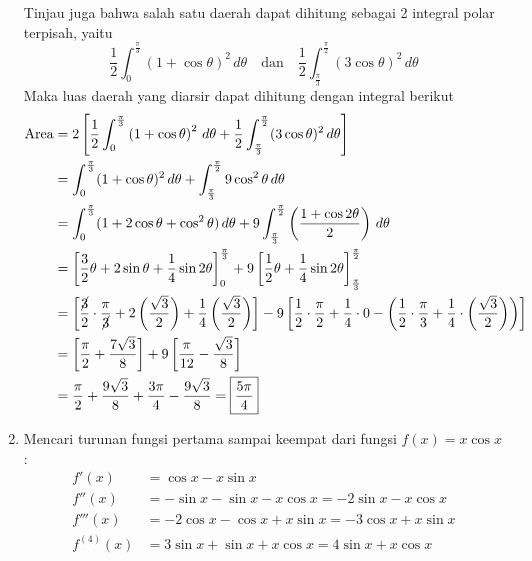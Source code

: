 \documentclass[11pt,openany,a4paper]{article}
\begin{document}
\begin{enumerate}
        Tinjau juga bahwa salah satu daerah dapat dihitung sebagai 2 integral polar terpisah, yaitu
        \[ \frac{1}{2}\int_{0}^{\frac{\pi}{3}} \left(1+\cos\theta\right)^2 \, d\theta \quad\text{dan}\quad \frac{1}{2}\int_{\frac{\pi}{3}}^{\frac{\pi}{2}} \left(3\cos\theta\right)^2 \, d\theta \]
        Maka luas daerah yang diarsir dapat dihitung dengan integral berikut
        \begin{align*}
            \text{Area} &= 2\left[\frac{1}{2}\int_{0}^{\frac{\pi}{3}} \left(1+\cos\theta\right)^2 \, d\theta + \frac{1}{2}\int_{\frac{\pi}{3}}^{\frac{\pi}{2}} (3\cos\theta)^2 \, d\theta\right]\\
            &= \int_{0}^{\frac{\pi}{3}} (1+\cos\theta)^2 \, d\theta + \int_{\frac{\pi}{3}}^{\frac{\pi}{2}} 9\cos^2\theta \, d\theta\\
            &= \int_{0}^{\frac{\pi}{3}} (1 + 2\cos\theta + \cos^2\theta) \, d\theta + 9\int_{\frac{\pi}{3}}^{\frac{\pi}{2}} \left(\frac{1+\cos 2\theta}{2}\right) \, d\theta\\
            &= \left[\frac{3}{2}\theta + 2\sin\theta + \frac{1}{4}\sin 2\theta\right]_{0}^{\frac{\pi}{3}} + 9\left[\frac{1}{2}\theta + \frac{1}{4}\sin 2\theta\right]_{\frac{\pi}{3}}^{\frac{\pi}{2}}\\
            &= \left[\frac{\cancel{3}}{2}\cdot\frac{\pi}{\cancel{3}} + 2\left(\frac{\sqrt{3}}{2}\right) + \frac{1}{4}\left(\frac{\sqrt{3}}{2}\right)\right] - 9\left[\frac{1}{2}\cdot\frac{\pi}{2} + \frac{1}{4}\cdot 0 - \left(\frac{1}{2}\cdot\frac{\pi}{3} + \frac{1}{4}\cdot\left(\frac{\sqrt{3}}{2}\right)\right)\right]\\
            &= \left[\frac{\pi}{2} + \frac{7\sqrt{3}}{8}\right] + 9\left[\frac{\pi}{12} - \frac{\sqrt{3}}{8}\right]\\
            &= \frac{\pi}{2} + \frac{9\sqrt{3}}{8} + \frac{3\pi}{4} - \frac{9\sqrt{3}}{8}= \boxed{\frac{5\pi}{4}}
        \end{align*}
      \item Mencari turunan fungsi pertama sampai keempat dari fungsi \( f(x) = x \cos x \):
        \begin{align*}
            f'(x) &= \cos x - x\sin x\\
            f''(x) &= -\sin x - \sin x - x\cos x = -2\sin x - x\cos x\\
            f'''(x) &= -2\cos x - \cos x + x\sin x = -3\cos x + x\sin x\\
            f^{(4)}(x) &= 3\sin x + \sin x + x\cos x = 4\sin x + x\cos x 
        \end{align*}

\end{enumerate}
\end{document}
